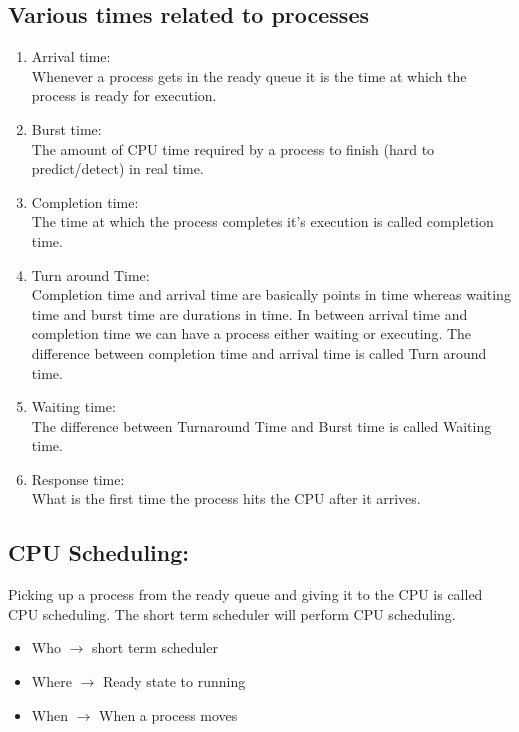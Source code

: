 \documentclass[12pt,letterpaper]{article}
\begin{document}
\subsection{Various times related to processes}
\begin{enumerate}
  \item Arrival time: \\ Whenever a process gets in the ready queue it is the time at which the process is ready for execution.
  \item Burst time: \\ The amount of CPU time required by a process to finish (hard to predict/detect) in real time. 
  \item Completion time: \\ The time at which the process completes it's execution is called completion time.
  \item Turn around Time: \\ Completion time and arrival time are basically points in time whereas waiting time and burst time are durations in time. In between arrival time and completion time we can have a process 
    either waiting or executing. The difference between completion time and arrival time is called Turn around time.
  \item Waiting time: \\ The difference between Turnaround Time and Burst time is called Waiting time. 
  \item Response time: \\ What is the first time the process hits the CPU after it arrives. 
\end{enumerate}

\subsection{CPU Scheduling:}
Picking up a process from the ready queue and giving it to the CPU is called CPU scheduling. The short term scheduler will perform CPU scheduling. 
\begin{itemize}
  \item Who $\rightarrow$ short term scheduler 
  \item Where $\rightarrow$ Ready state to running 
  \item When $\rightarrow$ When a process moves
\end{itemize}
\end{document}
